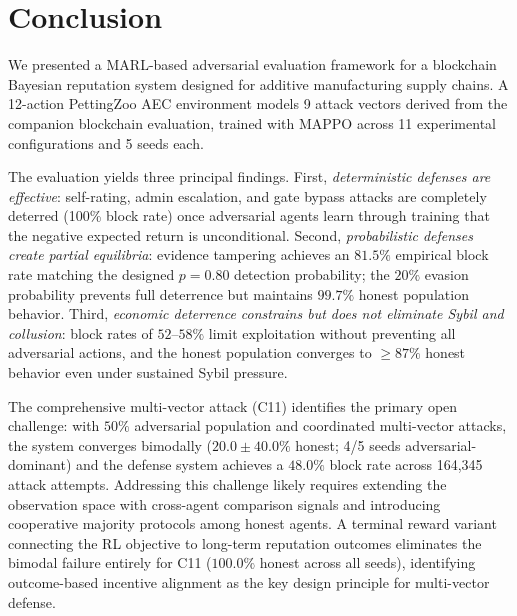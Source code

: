\section{Conclusion}
\label{sec:conclusion}

We presented a MARL-based adversarial evaluation framework for a
blockchain Bayesian reputation system designed for additive manufacturing
supply chains.  A 12-action PettingZoo AEC environment models 9 attack
vectors derived from the companion blockchain evaluation, trained with
MAPPO across 11 experimental configurations and 5 seeds each.

The evaluation yields three principal findings.  First, \emph{deterministic
defenses are effective}: self-rating, admin escalation, and gate bypass
attacks are completely deterred (100\% block rate) once adversarial agents
learn through training that the negative expected return is unconditional.
Second, \emph{probabilistic defenses create partial equilibria}: evidence
tampering achieves an $81.5\%$ empirical block rate matching the designed
$p=0.80$ detection probability; the $20\%$ evasion probability prevents
full deterrence but maintains $99.7\%$ honest population behavior.  Third,
\emph{economic deterrence constrains but does not eliminate Sybil and
collusion}: block rates of $52$--$58\%$ limit exploitation without
preventing all adversarial actions, and the honest population converges to
$\geq\!87\%$ honest behavior even under sustained Sybil pressure.

The comprehensive multi-vector attack (C11) identifies the primary open
challenge: with $50\%$ adversarial population and coordinated multi-vector
attacks, the system converges bimodally ($20.0\pm40.0\%$ honest; 4/5 seeds
adversarial-dominant) and the defense system achieves a $48.0\%$ block rate
across 164{,}345 attack attempts.  Addressing this challenge likely
requires extending the observation space with cross-agent comparison signals
and introducing cooperative majority protocols among honest agents.
A terminal reward variant connecting the RL objective to long-term reputation
outcomes eliminates the bimodal failure entirely for C11 ($100.0\%$ honest
across all seeds), identifying outcome-based incentive alignment as the key
design principle for multi-vector defense.

